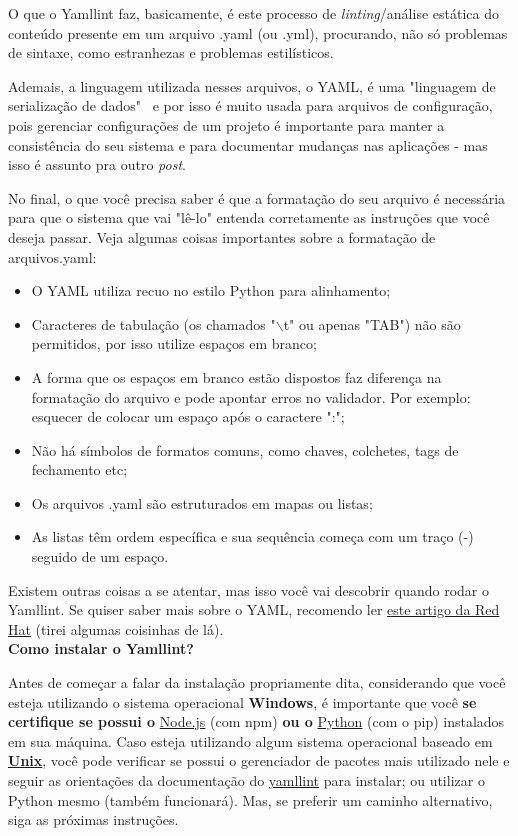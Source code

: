 O que o \gls{Yamllint} faz, basicamente, é este processo de \textit{linting}/análise estática do conteúdo presente em um arquivo .yaml (ou .yml), procurando, não só problemas de sintaxe, como estranhezas e problemas estilísticos. 

Ademais, a linguagem utilizada nesses arquivos, o YAML, é uma "linguagem de serialização de dados" \, e por isso é muito usada para arquivos de configuração, pois gerenciar configurações de um projeto é importante para manter a consistência do seu sistema e para documentar mudanças nas aplicações - mas isso é assunto pra outro \textit{post}.

No final, o que você precisa saber é que a formatação do seu arquivo é necessária para que o sistema que vai "lê-lo" entenda corretamente as instruções que você deseja passar. Veja algumas coisas importantes sobre a formatação de arquivos.yaml:

\begin{itemize}
    \item O YAML utiliza recuo no estilo \gls{Python} para alinhamento;
    \item Caracteres de tabulação (os chamados "$\backslash$t" ou apenas "TAB")  não são permitidos, por isso utilize espaços em branco;
    \item A forma que os espaços em branco estão dispostos faz diferença na formatação do arquivo e pode apontar erros no validador. Por exemplo: esquecer de colocar um espaço após o caractere ":";
    \item Não há símbolos de formatos comuns, como chaves, colchetes, tags de fechamento etc;
    \item Os arquivos .yaml são estruturados em mapas ou listas;
    \item As listas têm ordem específica e sua sequência começa com um traço (-) seguido de um espaço.
\end{itemize}

Existem outras coisas a se atentar, mas isso você vai descobrir quando rodar o \gls{Yamllint}. Se quiser saber mais sobre o YAML, recomendo ler \href{https://www.redhat.com/pt-br/topics/automation/what-is-yaml}{este artigo da Red Hat} (tirei algumas coisinhas de lá).\\

\textbf{Como instalar o Yamllint?}

Antes de começar a falar da instalação propriamente dita, considerando que você esteja utilizando o sistema operacional \textbf{Windows}, é importante que você \textbf{se certifique se possui o} \href{https://nodejs.org/en/}{Node.js} (com npm) \textbf{ou o} \href{https://python.org.br/instalacao-windows/}{Python} (com o pip) instalados em sua máquina. Caso esteja utilizando algum sistema operacional baseado em \textbf{\href{https://www.tecmundo.com.br/macos/10556-unix-o-pai-de-todos-os-sistemas-operacionais.htm}{Unix}}, você pode verificar se possui o gerenciador de pacotes mais utilizado nele e seguir as orientações da documentação do \href{https://yamllint.readthedocs.io/en/stable/quickstart.html}{yamllint} para instalar; ou utilizar o \gls{Python} mesmo (também funcionará). Mas, se preferir um caminho alternativo, siga as próximas instruções.\\


